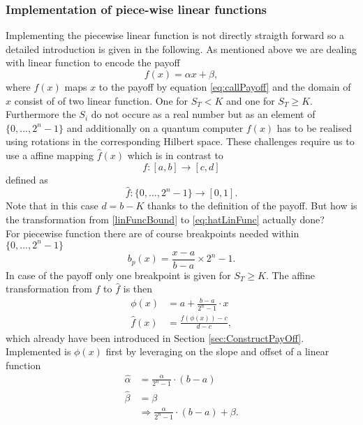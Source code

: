 \documentclass[../../main.tex]{subfiles}
\begin{document}
\subsubsection{Implementation of piece-wise linear functions}\label{sec:ImplPieceFunc}
Implementing the piecewise linear function is not directly straigth forward so a detailed introduction is given in the following. 
As mentioned above we are dealing with linear function to encode the payoff
\begin{equation}\label{eq:defLinearFunc}
  f(x) = \alpha x + \beta,
\end{equation}
where $f(x)$ maps $x$ to the payoff by equation \ref{eq:callPayoff} and the domain of $x$ consist of of two linear function. One for $S_T < K$ and one for $S_T \geq K$. 
Furthermore the $S_i$ do not occure as a real number but as an element of $\{ 0,...,2^n-1 \}$ and additionally on a quantum computer $f(x)$ has to be realised
using rotations in the corresponding Hilbert space. 
These challenges require us to use a affine mapping $\hat{f}(x)$ which is in contrast to
\begin{equation}\label{eq:linFuncBound}
  f: [ a,b ] \rightarrow [ c,d ]
\end{equation}
defined as
\begin{equation}\label{eq:hatLinFunc}
  \hat{f}: \{0,...,2^n-1 \} \rightarrow [ 0,1 ].
\end{equation}
Note that in this case $d=b-K$ thanks to the definition of the payoff. But how is the transformation from \ref{linFuncBound}
to \ref{eq:hatLinFunc} actually done?\\
For piecewise function there are of course breakpoints needed within $\{ 0,...,2^n-1 \}$
\begin{equation}\label{eq:breakpoints}
b_p(x) = \frac{x-a}{b-a} \times 2^n-1.
\end{equation}
In case of the payoff only one breakpoint is given for $ S_T \geq K $.
The affine transformation from $f$ to $\hat{f}$ is then
\begin{align}\label{eq:affinTransform}
  \phi(x) &= a + \frac{b-a}{2^n-1} \cdot x \\
  \hat{f}(x) &= \frac{f(\phi(x))-c}{d-c},
\end{align}
which already have been introduced in Section \ref{sec:ConstructPayOff}.\\
Implemented is $\phi(x)$ first by leveraging on the slope and offset of a linear function
\begin{align}\label{eq:mappedSlopeOffset}
  \hat{\alpha} &= \frac{\alpha}{2^n-1} \cdot (b-a)\\
  \hat{\beta} &= \beta\\
  &\Rightarrow \frac{\alpha}{2^n-1} \cdot (b-a) + \beta.
\end{align}
\end{document}
